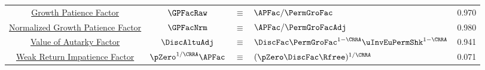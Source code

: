 \begin{table}
{\begin{tabular}{|c|ccl|c|}
        \href{https://\owner.github.io/BufferStockTheory\#GPFacRawDefn}{\phantom{Normalized }Growth Patience Factor}    & $\GPFacRaw$ & $\equiv$ & $\APFac/\PermGroFac $      & 0.970 \\
        \href{https://\owner.github.io/BufferStockTheory\#GPFacRawDefn}{Normalized Growth Patience Factor}                      & $\GPFacNrm$ & $\equiv$ & $ \APFac/\PermGroFacAdj$& 0.980 \\
        \href{https://\owner.github.io/BufferStockTheory\#VAFacDefn}{Value of Autarky Factor}         & $\DiscAltuAdj $ & $\equiv$ & $ \DiscFac \PermGroFac^{1-\CRRA}\uInvEuPermShk^{1-\CRRA}$       & 0.941 \\
        \href{https://\owner.github.io/BufferStockTheory\#WRICCond}{Weak Return Impatience Factor}         & $\pZero^{1/\CRRA} \APFac $ & $\equiv$ & $ (\pZero \DiscFac \Rfree)^{1/\CRRA}$       & 0.071 \\ \hline
      \end{tabular}
    } %

    \settowidth\TableWidth{\usebox{\TblBox}}
    \savebox{\TblShrunkBox}{
      \settowidth{\TblShrunk}{\usebox{\TblBox}}
      \resizebox{0.9\textwidth}{!}{\begin{minipage}{\TblShrunk}
          \usebox{\TblBox}
        \end{minipage}}
    }

    \usebox{\TblShrunkBox}


  \end{table}
